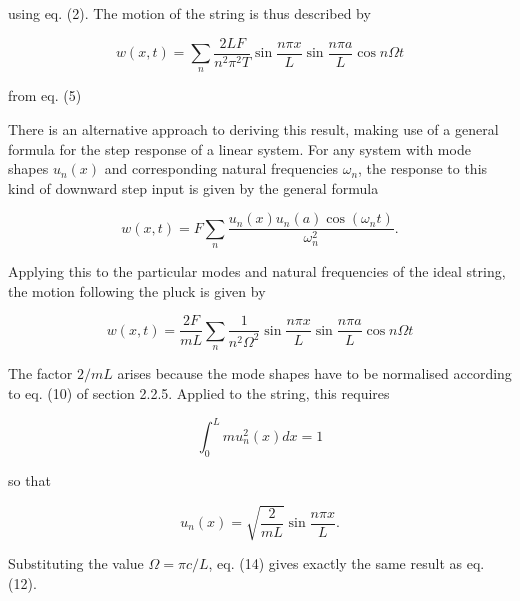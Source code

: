   using eq. (2). The motion of the string is thus described by 

  $$w(x,t)= \sum_n{\dfrac{2LF}{n^2 \pi^2 T} \sin \dfrac{n \pi x}{L} \sin 
  \dfrac{n \pi a}{L} \cos n \Omega t } \tag{12}$$ 

  from eq. (5) 

  There is an alternative approach to deriving this result, making use of a 
  general formula for the step response of a linear system. For any system with 
  mode shapes $u_n(x)$ and corresponding natural frequencies $\omega_n$, the 
  response to this kind of downward step input is given by the general formula 

  $$w(x,t)= F \sum_n{\frac{u_n(x) u_n(a) \cos(\omega_n t)}{\omega_n^2}}. 
  \tag{13}$$ 

  Applying this to the particular modes and natural frequencies of the ideal 
  string, the motion following the pluck is given by 

  $$w(x,t)= \frac{2F}{mL} \sum_n{\frac{1}{ n^2 \Omega^2} \sin \frac{n \pi x}{L} 
  \sin \frac{n \pi a}{L} \cos n \Omega t} \tag{14}$$ 

  The factor $2/mL$ arises because the mode shapes have to be normalised 
  according to eq. (10) of section 2.2.5. Applied to the string, this requires 

  $$\int_0^L{m u_n^2(x) dx}=1 \tag{15}$$ 

  so that 

  $$u_n(x) = \sqrt{\frac{2}{mL}} \sin \frac{n \pi x}{L}. \tag{16}$$ 

  Substituting the value $\Omega= \pi c/L$, eq. (14) gives exactly the same 
  result as eq. (12). 